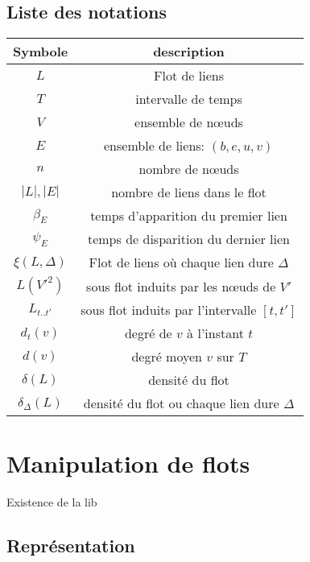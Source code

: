 \subsection{Liste des notations}
\begin{center}
\begin{tabular}{|c|c|}
\hline Symbole & description \\
\hline $L$ & Flot de liens \\ 
$T$ & intervalle de temps  \\
$V$ & ensemble de n\oe uds\\
$E$ & ensemble de liens: $(b,e,u,v)$ \\
$n$ & nombre de n\oe uds  \\
$|L|,|E|$ & nombre de liens dans le flot \\
$\beta_E$ & temps d'apparition du premier lien\\
$\psi_E$ & temps de disparition du dernier lien\\
$\xi(L,\Delta)$ & Flot de liens où chaque lien dure $\Delta$\\
$L(V'^2)$ & sous flot induits par les n\oe uds de $V'$ \\
$L_{t..t'}$ & sous flot induits par l'intervalle $[t,t']$ \\
$d_t(v)$ & degré de $v$ à l'instant $t$\\
$d(v)$ & degré moyen $v$ sur $T$\\
$\delta(L)$ & densité du flot\\
$\delta_{\Delta}(L)$ & densité du flot ou chaque lien dure $\Delta$\\

\hline
\end{tabular} 
\end{center}



\section{Manipulation de flots}
Existence de la lib

\subsection{Représentation}
